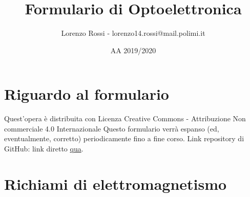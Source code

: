 \documentclass{article}
\title{Formulario di Optoelettronica}
\author{Lorenzo Rossi - lorenzo14.rossi@mail.polimi.it}
\date{AA 2019/2020}
\begin{document}
\maketitle

\section{Riguardo al formulario}
Quest'opera è distribuita con Licenza Creative Commons - Attribuzione Non commerciale 4.0 Internazionale \ccbynceu  \newline
Questo formulario verrà espanso (ed, eventualmente, corretto) periodicamente fino a fine corso.
Link repository di GitHub: \url{} link diretto \href{}{qua}. \newline 

\section{Richiami di elettromagnetismo}
\end{document}

